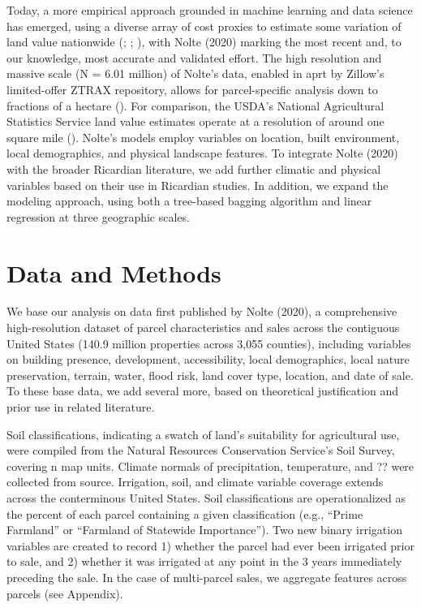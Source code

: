 \documentclass[12pt]{article}
\begin{document}
\par Today, a more empirical approach grounded in machine learning and data science has emerged, using a diverse array of cost proxies to estimate some variation of land value nationwide (\cite{Withey2012MaximisingUSA}; 
\cite{Johnson2020AReduction}; \cite{Lawler2020PlanningConfiguration}), with Nolte (2020) marking the most recent and, to our knowledge, most accurate and validated effort. The high resolution and massive scale (N = 6.01 million) of Nolte's data, enabled in aprt by Zillow's limited-offer ZTRAX repository, allows for parcel-specific analysis down to fractions of a hectare (\cite{Zillow2019ZTRAX:2019-Q4}). For comparison, the USDA's National Agricultural Statistics Service land value estimates operate at a resolution of around one square mile (\cite{USDepartmentofAgriculture2019AgriculturalEstimates}). Nolte's models employ variables on location, built environment, local demographics, and physical landscape features. To integrate Nolte (2020) with the broader Ricardian literature, we add further climatic and physical variables based on their use in Ricardian studies. In addition, we expand the modeling approach, using both a tree-based bagging algorithm and linear regression at three geographic scales.

\section{Data and Methods}
We base our analysis on data first published by Nolte (2020), a comprehensive high-resolution dataset of parcel characteristics and sales across the contiguous United States (140.9 million properties across 3,055 counties), including variables on building presence, development, accessibility, local demographics, local nature preservation, terrain, water, flood risk, land cover type, location, and date of sale. To these base data, we add several more, based on theoretical justification and prior use in related literature. 


Soil classifications, indicating a swatch of land’s suitability for agricultural use, were compiled from the Natural Resources Conservation Service’s Soil Survey, covering n map units. Climate normals of precipitation, temperature, and ?? were collected from source. Irrigation, soil, and climate variable coverage extends across the conterminous United States. Soil classifications are operationalized as the percent of each parcel containing a given classification (e.g., “Prime Farmland” or “Farmland of Statewide Importance”). Two new binary irrigation variables are created to record 1) whether the parcel had ever been irrigated prior to sale, and 2) whether it was irrigated at any point in the 3 years immediately preceding the sale. In the case of multi-parcel sales, we aggregate features across parcels (see Appendix).
\end{document}
